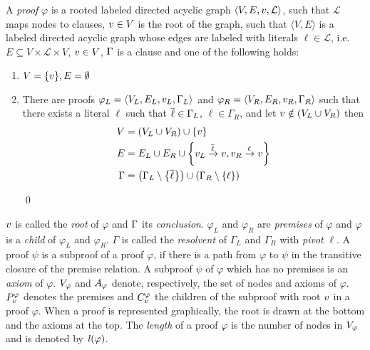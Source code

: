 \begin{definition}[Proof] 
\label{def:proof}
A \emph{proof} $\varphi$ is a rooted labeled directed acyclic graph $\langle V,E,v,\mathcal{L} \rangle$, such that
$\mathcal{L}$ maps nodes to clauses, $v \in V$ is the root of the graph, 
such that $\langle V,E \rangle$ is a labeled directed acyclic graph whose edges are labeled with literals $\ell \in \mathcal{L}$, i.e. $E \subseteq V \times \mathcal{L} \times V$, $v \in V$, $\Gamma$ is a clause 
and one of the following holds:

\begin{enumerate}
	\item $V = \{v\}, E = \emptyset$
	\item \label{enum:resCase} There are proofs $\varphi_L = \langle V_L, E_L, v_L,\Gamma_L \rangle$ and $\varphi_R = \langle V_R, E_R, v_R, \Gamma_R \rangle$ such that there exists a literal
				$\ell$ such that $\overline{\ell} \in \Gamma_L$, $\ell \in \Gamma_R$, and let $v \notin (V_L \cup V_R)$ then
		\begin{align*}
      V &= (V_L \cup V_R) \cup \{v \} \\
      E &= E_L \cup E_R \cup
                    \left\{v_L \xrightarrow{\overline{\ell}} v , v_R \xrightarrow{\ell} v \right\} \\
     \Gamma &= \left( \Gamma_L \setminus \left\{ \overline{\ell} \right\} \right) \cup \left( \Gamma_R
                    \setminus \left\{ \ell \right\} \right)
    \end{align*}
		
\qed
\end{enumerate}
$v$ is called the \emph{root} of $\varphi$ and $\Gamma$ its \emph{conclusion}.
$\varphi_L$ and $\varphi_R$ are \emph{premises} of $\varphi$ and $\varphi$ is a \emph{child} of $\varphi_L$ and $\varphi_R$.
$\Gamma$ is called the \emph{resolvent} of $\Gamma_L$ and $\Gamma_R$ with \emph{pivot} $\ell$.
A proof $\psi$ is a subproof of a proof $\varphi$, if there is a path from $\varphi$ to $\psi$ in the transitive closure of the premise relation.
A subproof $\psi$ of $\varphi$ which has no premises is an \emph{axiom} of $\varphi$.
$V_{\varphi}$ and $A_{\varphi}$ denote, respectively, the set of nodes and axioms of $\varphi$. $P_{v}^{\varphi}$ denotes the premises and $C_{v}^{\varphi}$ the children of the subproof with root $v$ in a proof $\varphi$. When a proof is represented graphically, the root is drawn at the bottom and the axioms at the top. The \emph{length} of a proof $\varphi$ is the number of nodes in $V_{\varphi}$ and is denoted by $\mathit{l}(\varphi)$.
\end{definition}


